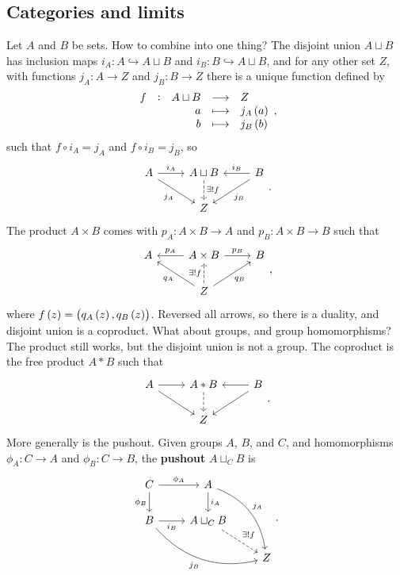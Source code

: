 \subsection{Categories and limits}

Let $ A $ and $ B $ be sets. How to combine into one thing? The disjoint union $ A \sqcup B $ has inclusion maps $ i_A : A \hookrightarrow A \sqcup B $ and $ i_B : B \hookrightarrow A \sqcup B $, and for any other set $ Z $, with functions $ j_A : A \to Z $ and $ j_B : B \to Z $ there is a unique function defined by
$$ \functions[f]{A \sqcup B}{Z}{a}{j_A\br{a}}{b}{j_B\br{b}}, $$
such that $ f \circ i_A = j_A $ and $ f \circ i_B = j_B $, so
$$
\begin{tikzcd}
A \arrow{r}{i_A} \arrow{dr}[swap]{j_A} & A \sqcup B \arrow[dashed]{d}{\exists !f} & B \arrow{l}[swap]{i_B} \arrow{dl}{j_B} \\
& Z &
\end{tikzcd}.
$$
The product $ A \times B $ comes with $ p_A : A \times B \to A $ and $ p_B : A \times B \to B $ such that
$$
\begin{tikzcd}
A & A \times B \arrow{l}[swap]{p_A} \arrow{r}{p_B} & B \\
& Z \arrow{ul}{q_A} \arrow[dashed]{u}{\exists !f} \arrow{ur}[swap]{q_B} &
\end{tikzcd},
$$
where $ f\br{z} = \br{q_A\br{z}, q_B\br{z}} $. Reversed all arrows, so there is a duality, and disjoint union is a coproduct. What about groups, and group homomorphisms? The product still works, but the disjoint union is not a group. The coproduct is the free product $ A * B $ such that
$$
\begin{tikzcd}
A \arrow{r} \arrow{dr} & A * B \arrow[dashed]{d} & B \arrow{l} \arrow{dl} \\
& Z &
\end{tikzcd}.
$$
More generally is the pushout. Given groups $ A $, $ B $, and $ C $, and homomorphisms $ \phi_A : C \to A $ and $ \phi_B : C \to B $, the \textbf{pushout} $ A \sqcup_C B $ is
$$
\begin{tikzcd}
C \arrow{r}{\phi_A} \arrow{d}[swap]{\phi_B} & A \arrow{d}{i_A} \arrow[bend left=30]{ddr}{j_A} & \\
B \arrow{r}[swap]{i_B} \arrow[bend right=30]{drr}[swap]{j_B} & A \sqcup_C B \arrow[dashed]{dr}{\exists !f} & \\
& & Z
\end{tikzcd}.
$$

